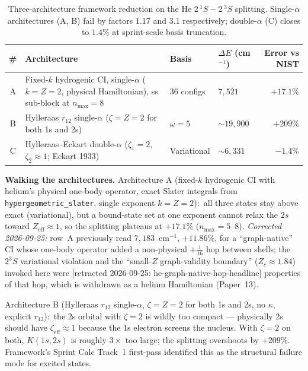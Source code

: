 \documentclass[11pt]{article}
\begin{document}
\begin{table}[h!]
\centering\small
\caption{Three-architecture framework reduction on the He
$2\,^{1}S - 2\,^{3}S$ splitting.  Single-$\alpha$ architectures
(A, B) fail by factors $1.17$ and $3.1$ respectively; double-$\alpha$
(C) closes to $1.4\%$ at sprint-scale basis truncation.}
\label{tab:autopsy_he_singlet_triplet}
\begin{tabular}{clllr}
\toprule
\# & Architecture & Basis & $\Delta E$ (cm$^{-1}$) & Error vs NIST \\
\midrule
A & Fixed-$k$ hydrogenic CI, single-$\alpha$ ($k = Z = 2$, physical Hamiltonian), ss sub-block at $n_{\max} = 8$ & $36$ configs & $7{,}521$ & $+17.1\%$ \\
B & Hylleraas $r_{12}$ single-$\alpha$ ($\zeta = Z = 2$ for both 1s and 2s) & $\omega = 5$ & $\sim 19{,}900$ & $+209\%$ \\
C & Hylleraas--Eckart double-$\alpha$ ($\zeta_1 = 2$, $\zeta_2 \approx 1$; Eckart 1933) & Variational & $\sim 6{,}331$ & $-1.4\%$ \\
\bottomrule
\end{tabular}
\end{table}

\textbf{Walking the architectures.}  Architecture A (fixed-$k$
hydrogenic CI with helium's physical one-body operator, exact Slater
integrals from \texttt{hypergeometric\_slater}, single exponent
$k = Z = 2$):\ all three states stay above exact (variational), but a
bound-state set at one exponent cannot relax the $2s$ toward
$Z_{\mathrm{eff}} \approx 1$, so the splitting plateaus at $+17.1\%$
($n_{\max} = 5$--$8$).  \emph{Corrected 2026-09-25:} row~A previously
read $7{,}183$~cm$^{-1}$, $+11.86\%$, for a ``graph-native'' CI whose
one-body operator added a non-physical $+\tfrac{1}{16}$ hop between
shells; the $2^3S$ variational violation and the ``small-$Z$
graph-validity boundary'' ($Z_c \approx 1.84$) invoked here were [retracted 2026-09-25: he-graph-native-hop-headline]
properties of that hop, which is withdrawn as a helium Hamiltonian
(Paper~13).

Architecture B (Hylleraas $r_{12}$ single-$\alpha$, $\zeta = Z = 2$
for both 1s and 2s, no $\kappa$, explicit $r_{12}$):\ the 2s orbital
with $\zeta = 2$ is wildly too compact --- physically 2s should
have $\zeta_{\mathrm{eff}} \approx 1$ because the 1s electron
screens the nucleus.  With $\zeta = 2$ on both, $K(1s, 2s)$ is
roughly $3\times$ too large; the splitting overshoots by $+209\%$.
Framework's Sprint Calc Track~1 first-pass identified this as the
structural failure mode for excited states.
\end{document}
